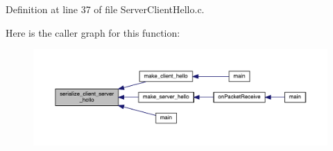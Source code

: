 Definition at line 37 of file Server\+Client\+Hello.\+c.



Here is the caller graph for this function\+:\nopagebreak
\begin{figure}[H]
\begin{center}
\leavevmode
\includegraphics[width=350pt]{_server_client_hello_8h_ac5f8704687d37db6d67172540b3005e6_icgraph}
\end{center}
\end{figure}


